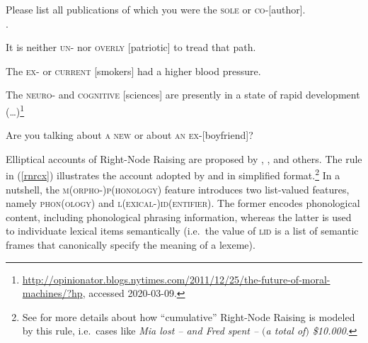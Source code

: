 {
\begin{exe}
\ex \begin{xlista}
\ex Please list all publications of which you were the \textsc{sole} or
\textsc{co}-[author].\\
 \citep[1325, footnote 44]{rodney}.
 
\ex  It is neither \textsc{un}- nor \textsc{overly} [patriotic] to tread that path.
 
\ex The \textsc{ex-} or \textsc{current} [smokers] had a higher blood pressure.\\
\citep[]{chaveslp} 

\ex The \textsc{neuro}- and \textsc{cognitive} [sciences] are
presently in a state of rapid development
(\ldots{})\footnote{\url{http://opinionator.blogs.nytimes.com/2011/12/25/the-future-of-moral-machines/?hp},
  accessed 2020-03-09.}

\ex Are you talking about \textsc{a new}  or about \textsc{an ex}-[boyfriend]?\\
\citep[867]{chavesrnr}

\end{xlista}\label{rnrex2}
\end{exe}



Elliptical accounts of Right-Node Raising are proposed by \citet{Beavers},
\citet{Yatabe:04}, \citet{chavesrnr} and others. The rule in (\ref{rnrcx}) illustrates the account adopted by 
 \citet[874]{chavesrnr}  and \citet[]{aoi}
  in simplified format.\footnote{See \citet{chavesrnr} for more details about how ``cumulative'' Right-Node Raising is modeled by this rule, i.e.\
 cases like \emph{Mia lost -- and Fred spent -- $($a total of$)$ \$10.000}.}
In a nutshell, the \textsc{m(orpho-)p(honology)} feature introduces two list-valued features, namely \textsc{phon}(\textsc{ology}) and \textsc{l(exical-)id(entifier)}. The former encodes phonological content, including phonological phrasing information,  whereas the latter is used to individuate lexical items semantically (i.e.\  the value
of \textsc{lid} is a list of semantic frames that canonically specify the meaning of a lexeme).

}
